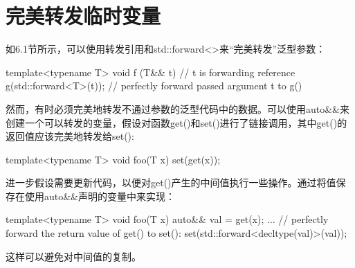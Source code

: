 \section{完美转发临时变量}
如6.1节所示，可以使用转发引用和std::forward<>来“完美转发”泛型参数：

\begin{cpp}
template<typename T>
void f (T&& t) { // t is forwarding reference
	g(std::forward<T>(t)); // perfectly forward passed argument t to g()
}
\end{cpp}

然而，有时必须完美地转发不通过参数的泛型代码中的数据。可以使用auto\&\&来创建一个可以转发的变量，假设对函数get()和set()进行了链接调用，其中get()的返回值应该完美地转发给set():

\begin{cpp}
template<typename T>
void foo(T x) {
	set(get(x));
}
\end{cpp}

进一步假设需要更新代码，以便对get()产生的中间值执行一些操作。通过将值保存在使用auto\&\&声明的变量中来实现：

\begin{cpp}
template<typename T>
void foo(T x) {
	auto&& val = get(x);
	...
	// perfectly forward the return value of get() to set():
	set(std::forward<decltype(val)>(val));
}
\end{cpp}

这样可以避免对中间值的复制。








































